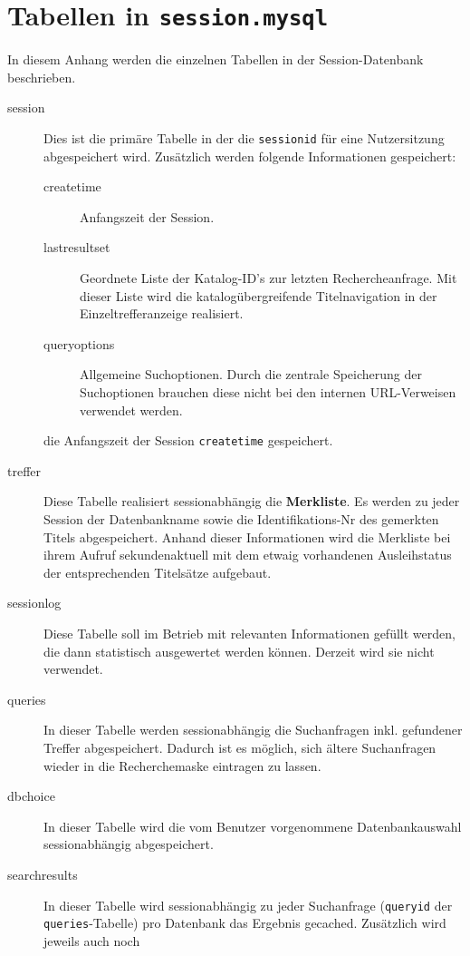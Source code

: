 \documentclass[11pt, twoside, a4paper, BCOR8mm, DIV12, bibtotoc,idxtotoc]{scrbook}
\begin{document}
\chapter{Tabellen in \texttt{session.mysql}}

In diesem Anhang werden die einzelnen Tabellen in der
Session-Datenbank beschrieben.

\begin{description}
\item[session] Dies ist die primäre Tabelle in der die
  \texttt{sessionid} für eine Nutzersitzung abgespeichert wird.
  Zusätzlich werden folgende Informationen gespeichert:
  \begin{description}
  \item[createtime] Anfangszeit der Session.
  \item[lastresultset] Geordnete Liste der Katalog-ID's zur letzten
    Rechercheanfrage. Mit dieser Liste wird die katalogübergreifende
    Titelnavigation in der Einzeltrefferanzeige realisiert.
  \item[queryoptions] Allgemeine Suchoptionen. Durch die zentrale Speicherung der
    Suchoptionen brauchen diese nicht bei den internen URL-Verweisen
    verwendet werden.
  \end{description}
die Anfangszeit der Session \texttt{createtime}
  gespeichert. 
\item[treffer] Diese Tabelle realisiert sessionabhängig die
  \textbf{Merkliste}. Es werden zu jeder Session der Datenbankname sowie die
  Identifikations-Nr des gemerkten Titels abgespeichert. Anhand dieser
  Informationen wird die Merkliste bei ihrem Aufruf sekundenaktuell
  mit dem etwaig vorhandenen Ausleihstatus der entsprechenden
  Titelsätze aufgebaut.
\item[sessionlog] Diese Tabelle soll im Betrieb mit relevanten
  Informationen gefüllt werden, die dann statistisch ausgewertet
  werden können. Derzeit wird sie nicht verwendet.
\item[queries] In dieser Tabelle werden sessionabhängig die
  Suchanfragen inkl. gefundener Treffer ab\-ge\-spei\-chert. Dadurch ist es
  möglich, sich ältere Suchanfragen wieder in die Recherchemaske
  eintragen zu lassen.
\item[dbchoice] In dieser Tabelle wird die vom Benutzer vorgenommene
  Datenbankauswahl session\-ab\-hängig abgespeichert.
\item[searchresults] In dieser Tabelle wird session\-ab\-hän\-gig zu jeder
  Suchanfrage (\texttt{queryid} der \texttt{queries}-Tabelle) pro
  Datenbank das Ergebnis gecached. Zusätzlich wird jeweils auch noch

\end{description}
\end{document}
